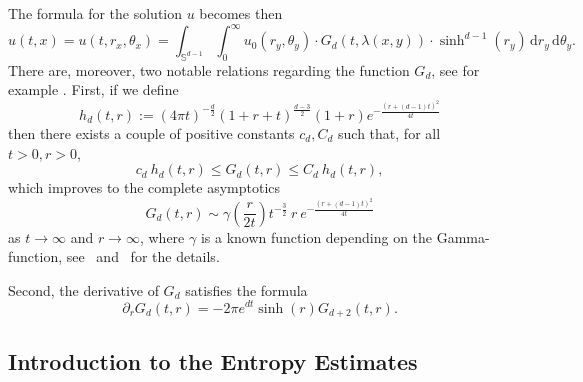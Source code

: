 \documentclass[12pt,longbibliography]{article}
\def\d{\,\mathrm{d}}
\def\d{\,\mathrm{d}}
\theoremstyle{definition}
\theoremstyle{remark}
\theoremstyle{example}
\begin{document}
The formula for the solution $u$ becomes then
\[
	u(t,x)= u(t,r_x,\theta_x) = \int_{\mathbb{S}^{d-1}}\int_0^\infty u_0(r_y,\theta_y)\cdot G_d(t,\lambda(x,y))\cdot  \sinh^{d-1}(r_y)\d r_y \d \theta_y.
\]
There are, moreover, two notable relations regarding the function $G_d$, see for example \cite{grigoryan1998heat}. First, if we define
\[
h_d(t,r):= (4\pi t)^{-\frac{d}{2}}(1+r+t)^{\frac{d-3}{2}}(1+r)e^{-\frac{(r+(d-1)t)^2}{4t}}
\]
then there exists a couple of positive constants $c_d, C_d$ such that, for all $t>0, r>0$,
\begin{equation}\label{eq:bound_heat_kernel_in_terms_of_h}
	c_d\ h_d(t,r)\leq G_d(t,r)\leq C_d\ h_d(t,r),
\end{equation}
which improves to the complete asymptotics
\[
	G_d(t,r)\sim \gamma\left(\frac{r}{2t}\right)t^{-\frac{3}{2}}\ r\ e^{-\frac{(r+(d-1)t)^2}{4t}}
\]
as $t\to\infty$ and $r\to \infty$, where $\gamma$ is a known function depending on the Gamma-function, see~\cite{Anker-Ji-1999} and~\cite[Appendix]{Papageorgiou2025} for the details.

Second, the derivative of $G_d$ satisfies the formula
\begin{equation}\label{eq:recurrence_derivative_kernels}
	\partial_r G_d(t,r) = -2\pi e^{dt}\sinh(r) G_{d+2}(t,r).
\end{equation}

\subsection{Introduction to the Entropy Estimates}
\end{document}
